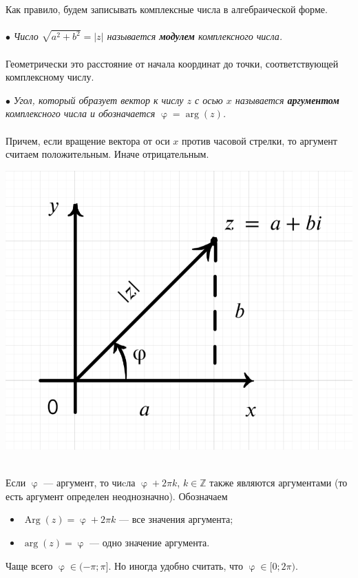 \documentclass[a4paper, 12pt]{article}
\newcommand{\Z}{\mathbb{Z}}
\renewcommand{\varphi}{\upvarphi}
\newcommand{\Arg}{\operatorname{Arg}}
\begin{document}
Как правило, будем записывать комплексные числа в алгебраической форме.\\\\
$\bullet$ \textit{Число $\sqrt{a^2 + b^2} = |z|$ называется \textbf{модулем} комплексного числа.}\\\\
Геометрически это расстояние от начала координат до точки, соответствующей комплексному числу.\\
\noindent
\parbox[b][4.5cm][t]{95mm}{
	$\bullet$ \textit{Угол, который образует вектор к числу $z$ с осью $x$ называется \textbf{аргументом} комплексного числа и обозначается $\varphi = \arg (z)$.}\\\\
	Причем, если вращение вектора от оси $x$ против часовой стрелки, то аргумент считаем положительным. Иначе отрицательным.
	}
\hfill
\parbox[b][5cm][t]{70mm}{
	\includegraphics[scale=0.25]{images/003.png}}\\
 Если $\varphi$ --- аргумент, то чиcла $\varphi + 2\pi k$, $k\in \Z$ также являются аргументами (то есть аргумент определен неоднозначно). Обозначаем \begin{itemize}
	\item $\Arg(z) = \varphi + 2\pi k$ --- все значения аргумента;
	\item $\arg (z) = \varphi$ --- одно значение аргумента.
\end{itemize}
Чаще всего $\varphi \in (-\pi; \pi]$. Но иногда удобно считать, что $\varphi \in [0;2\pi)$.\\\\
\end{document}
